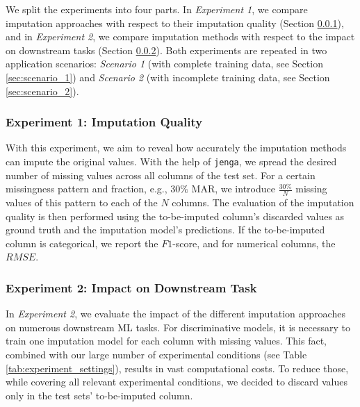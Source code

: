 \documentclass[utf8]{frontiersSCNS} %
\newcommand{\code}[1]{\texttt{#1}}
\begin{document}
We split the experiments into four parts. In \emph{Experiment 1}, we compare imputation approaches with respect to their imputation quality (Section \ref{sec:experiment_1}), and in \emph{Experiment 2}, we compare imputation methods with respect to the impact on downstream tasks (Section \ref{sec:experiment_2}). Both experiments are repeated in two application scenarios: \emph{Scenario 1} (with complete training data, see Section \ref{sec:scenario_1}) and \emph{Scenario 2} (with incomplete training data, see Section \ref{sec:scenario_2}).

\subsubsection{Experiment 1: Imputation Quality}
\label{sec:experiment_1}
%
With this experiment, we aim to reveal how accurately the imputation methods can impute the original values.
With the help of \code{jenga}, we spread the desired number of missing values across all columns of the test set. For a certain missingness pattern and fraction, e.g., $30\%$ MAR, we introduce $\frac{30\%}{N}$ missing values of this pattern to each of the $N$ columns.
The evaluation of the imputation quality is then performed using the to-be-imputed column's discarded values as ground truth and the imputation model's predictions. If the to-be-imputed column is categorical, we report the $F1$-score, and for numerical columns, the $RMSE$.


\subsubsection{Experiment 2: Impact on Downstream Task}
\label{sec:experiment_2}
%
In \emph{Experiment 2}, we evaluate the impact of the different imputation approaches on numerous downstream ML tasks. For discriminative models, it is necessary to train one imputation model for each column with missing values. This fact, combined with our large number of experimental conditions (see Table \ref{tab:experiment_settings}), results in vast computational costs. To reduce those, while covering all relevant experimental conditions, we decided to discard values only in the test sets' to-be-imputed column.
\end{document}
